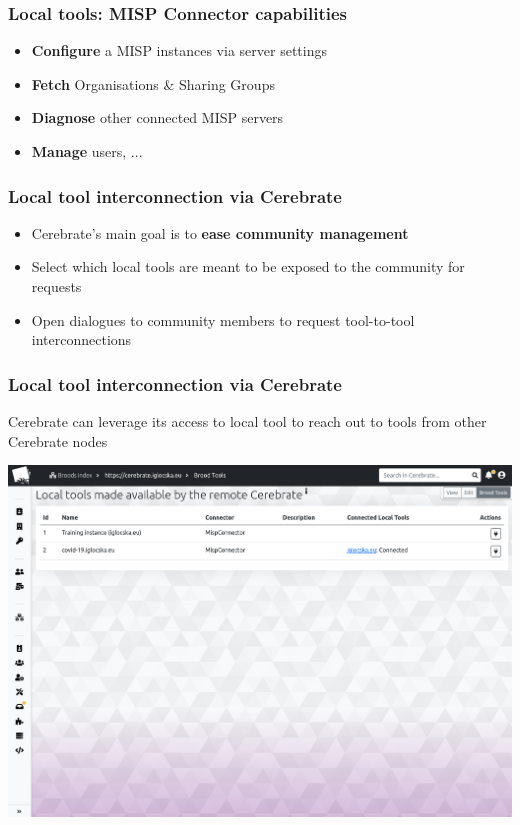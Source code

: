 \begin{frame}
\frametitle{Local tools: MISP Connector capabilities}
    \begin{itemize}
        \item \textbf{Configure} a MISP instances via server settings
        \item \textbf{Fetch} Organisations \& Sharing Groups
        \item \textbf{Diagnose} other connected MISP servers
        \item \textbf{Manage} users, ...
    \end{itemize}
\end{frame}

\begin{frame}
\frametitle{Local tool interconnection via Cerebrate}
    \begin{itemize}
        \item Cerebrate's main goal is to \textbf{ease community management}
        \item Select which local tools are meant to be exposed to the community for requests
        \item Open dialogues to community members to request tool-to-tool interconnections
    \end{itemize}
\end{frame}

\begin{frame}
\frametitle{Local tool interconnection via Cerebrate}
    Cerebrate can leverage its access to local tool to reach out to tools from other Cerebrate nodes
    \begin{center}
        \includegraphics[width=0.85\linewidth]{pictures/tools-made-available.png}
    \end{center}
\end{frame}


